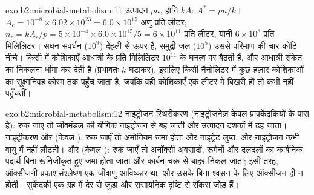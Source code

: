 \begin{solution}{exo:b2:microbial-metabolism:11}
उत्पादन $pn$, हानि $kA$: $A^* = pn/k$। $A_c = 10^{-8}\times
6.02\times 10^{23} = 6.0\times 10^{15}$ अणु प्रति लीटर; $n_c =
kA_c/p = 5\times 10^{-4}\times 6.0\times 10^{15}/5 = 6\times 10^{11}$
प्रति लीटर, यानी $6\times 10^{8}$ प्रति मिलिलिटर। सघन संवर्धन
($10^{9}$) देहली से ऊपर है, समुद्री जल ($10^{5}$) उससे परिमाण की चार
कोटि नीचे। किसी  में कोशिकाएँ आधात्री के प्रति मिलिलिटर
$10^{11}$ के घनत्व पर बैठती हैं, और आधात्री संकेत का निकलना धीमा कर
देती है (प्रभावतः $k$ घटाकर), इसलिए किसी नैनोलिटर में कुछ हज़ार
कोशिकाओं का सूक्ष्मनिवह कोरम तक पहुँच जाता है, जबकि वही कोशिकाएँ एक
लीटर में बिखरी हों तो कभी नहीं पहुँचतीं।
\end{solution}

\begin{solution}{exo:b2:microbial-metabolism:12}
नाइट्रोजन स्थिरीकरण (नाइट्रोजनेज़ केवल प्राक्केंद्रकियों के पास है):
रुक जाए तो जीवमंडल की यौगिक नाइट्रोजन  से बह जाती
और उत्पादन दशकों में ढह जाता।
नाइट्रीकरण और  (केवल ): रुक जाएँ तो
अमोनियम जमा होता और नाइट्रेट लुप्त, और नाइट्रोजन कभी वायु में नहीं
लौटती।  और 
(केवल ): रुक जाएँ तो अनॉक्सी अवसादों, रूमेनों और दलदलों
का कार्बनिक पदार्थ बिना खनिजीकृत हुए जमा होता जाता और कार्बन चक्र से
बाहर निकल जाता; इसी तरह, ऑक्सीजनी प्रकाशसंश्लेषण एक जीवाणु-आविष्कार
था, और उसके बिना श्वसन के लिए ऑक्सीजन ही न होती। सुकेंद्रकी एक
 ग्रह में देर से जुड़ा और रासायनिक दृष्टि से सँकरा
जोड़ हैं।
\end{solution}

